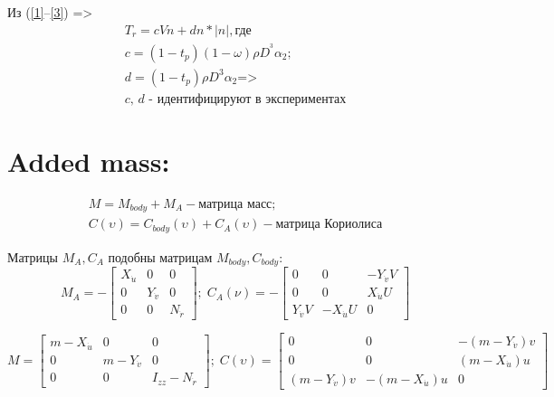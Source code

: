 \noindent{\rule{4cm}{0.4pt}}

Из (\ref{1}--\ref{3}) => 
\begin{eqnarray*}
    T_r = cVn + dn*|n|, \textit{где } \\
    c = (1-t_p)(1-\omega)\rho D^^3 \alpha_2; \\
    d = (1-t_p)\rho D^3 \alpha_2 \textit{=>} \\
    \textit{c, d - идентифицируют в экспериментах}
\end{eqnarray*}


\section*{Added mass:}

\begin{eqnarray*}
    M = M_{body} + M_A - \textit{матрица масс}; \\
    C(\upsilon) = C_{body}(\upsilon) + C_A(\upsilon) - \textit{матрица Кориолиса}
\end{eqnarray*}

Матрицы ${M_A, C_A}$ подобны матрицам ${M_{body}, C_{body}}$: \\
\begin{equation*}
    M_A = - \begin{bmatrix}  
                X_{\Dot{u}} & 0 & 0 \\
                0 & Y_{\Dot{v}} & 0 \\
                0 & 0 & N_{\Dot{r}}
            \end{bmatrix}; 
            \;
        C_A(\nu) = - \begin{bmatrix}
                    0 & 0 & -Y_{\Dot{v}}V \\
                    0 & 0 & X_{\Dot{u}}U \\
                    Y_{\Dot{v}}V & -X_{\Dot{u}}U & 0
                \end{bmatrix}
\end{equation*}

\begin{equation*}
    M = \begin{bmatrix}  
                m-X_{\Dot{u}} & 0 & 0 \\
                0 & m-Y_{\Dot{v}} & 0 \\
                0 & 0 & I_{zz}-N_{\Dot{r}}
            \end{bmatrix}; 
            \;
        C(\upsilon) = \begin{bmatrix}
                    0 & 0 & -(m-Y_{\Dot{v}})v \\
                    0 & 0 & (m-X_{\Dot{u}})u \\
                    (m-Y_{\Dot{v}})v & -(m-X_{\Dot{u}})u & 0
                \end{bmatrix}
\end{equation*}
